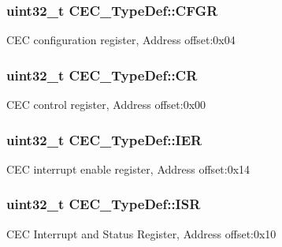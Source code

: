 \subsubsection[{\texorpdfstring{C\+F\+GR}{CFGR}}]{ uint32\+\_\+t C\+E\+C\+\_\+\+Type\+Def\+::\+C\+F\+GR}\hypertarget{struct_c_e_c___type_def_a91a55cd277c20e5c5ad228fd9013d014}{}\label{struct_c_e_c___type_def_a91a55cd277c20e5c5ad228fd9013d014}
C\+EC configuration register, Address offset\+:0x04 
\subsubsection[{\texorpdfstring{CR}{CR}}]{ uint32\+\_\+t C\+E\+C\+\_\+\+Type\+Def\+::\+CR}\hypertarget{struct_c_e_c___type_def_ab272f34d3acb1edeaaeaf087b284d77f}{}\label{struct_c_e_c___type_def_ab272f34d3acb1edeaaeaf087b284d77f}
C\+EC control register, Address offset\+:0x00 
\subsubsection[{\texorpdfstring{I\+ER}{IER}}]{ uint32\+\_\+t C\+E\+C\+\_\+\+Type\+Def\+::\+I\+ER}\hypertarget{struct_c_e_c___type_def_acbba4df34183910fdc40fb2c4918e303}{}\label{struct_c_e_c___type_def_acbba4df34183910fdc40fb2c4918e303}
C\+EC interrupt enable register, Address offset\+:0x14 
\subsubsection[{\texorpdfstring{I\+SR}{ISR}}]{ uint32\+\_\+t C\+E\+C\+\_\+\+Type\+Def\+::\+I\+SR}\hypertarget{struct_c_e_c___type_def_ae4e736a0aa1304172139d21b9d75c08a}{}\label{struct_c_e_c___type_def_ae4e736a0aa1304172139d21b9d75c08a}
C\+EC Interrupt and Status Register, Address offset\+:0x10 
